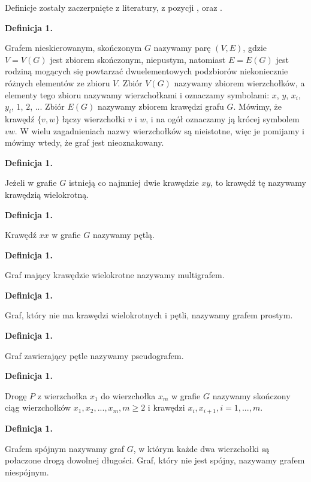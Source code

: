 Definicje zostały zaczerpnięte z literatury, z pozycji \cite{Wloch2008}, \cite{Wilson2012} oraz \cite{Wojciechwoski2013}.

\newcommand{\graphDefinitionIndex}{1}
\newcommand{\incrementGraphDefinitionIndex} {
    \pgfmathtruncatemacro{\graphDefinitionIndex}{\graphDefinitionIndex + 1}
}

\noindent
\textbf{Definicja \graphDefinitionIndex.}
\incrementGraphDefinitionIndex
Grafem nieskierowanym, skończonym $G$ nazywamy parę $(V,E)$, gdzie $V = V(G)$ jest zbiorem skończonym, niepustym,
natomiast $E = E(G)$ jest rodziną mogących się powtarzać dwuelementowych podzbiorów niekoniecznie różnych elementów ze zbioru $V$.
Zbiór $V(G)$ nazywamy zbiorem wierzchołków, a elementy tego zbioru nazywamy wierzchołkami i oznaczamy symbolami:
$x$, $y$, $x_i$, $y_i$, $1$, $2$, ... Zbiór $E(G)$ nazywamy zbiorem krawędzi grafu $G$.
Mówimy, że krawędź $\{v, w\}$ łączy wierzchołki $v$ i $w$, i na ogół oznaczamy ją krócej symbolem $vw$.
W wielu zagadnieniach nazwy wierzchołków są nieistotne, więc je pomijamy i mówimy wtedy, że graf jest nieoznakowany.

\noindent
\textbf{Definicja \graphDefinitionIndex.}
\incrementGraphDefinitionIndex
Jeżeli w grafie $G$ istnieją co najmniej dwie krawędzie $xy$, to krawędź tę nazywamy krawędzią wielokrotną.

\noindent
\textbf{Definicja \graphDefinitionIndex.}
\incrementGraphDefinitionIndex
Krawędź $xx$ w grafie $G$ nazywamy pętlą.

\noindent
\textbf{Definicja \graphDefinitionIndex.}
\incrementGraphDefinitionIndex
Graf mający krawędzie wielokrotne nazywamy multigrafem.

\noindent
\textbf{Definicja \graphDefinitionIndex.}
\incrementGraphDefinitionIndex
Graf, który nie ma krawędzi wielokrotnych i pętli, nazywamy grafem prostym.

\noindent
\textbf{Definicja \graphDefinitionIndex.}
\incrementGraphDefinitionIndex
Graf zawierający pętle nazywamy pseudografem.

\noindent
\textbf{Definicja \graphDefinitionIndex.}
\incrementGraphDefinitionIndex
Drogę $P$ z wierzchołka $x_1$ do wierzchołka $x_m$ w grafie $G$ nazywamy skończony ciąg wierzchołków
$x_1, x_2, ..., x_m, m \geqslant 2$ i krawędzi ${x_i, x_{i + 1}}, i = 1, ..., m$.

\noindent
\textbf{Definicja \graphDefinitionIndex.}
\incrementGraphDefinitionIndex
Grafem spójnym nazywamy graf $G$, w którym każde dwa wierzchołki są połaczone drogą dowolnej długości.
Graf, który nie jest spójny, nazywamy grafem niespójnym.

